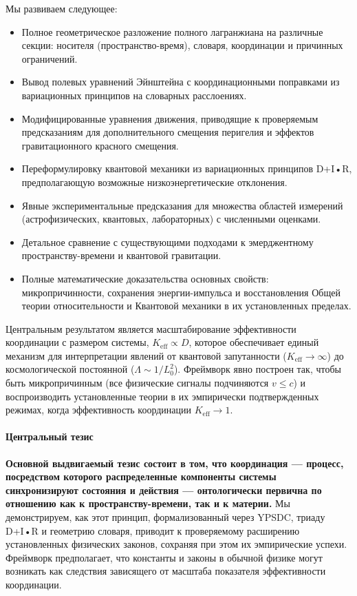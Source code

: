 \documentclass[11pt,a4paper]{article}
\begin{document}
	Мы развиваем следующее:
	\begin{itemize}
		\item Полное геометрическое разложение полного лагранжиана на различные секции: носителя (пространство-время), словаря, координации и причинных ограничений.
		\item Вывод полевых уравнений Эйнштейна с координационными поправками из вариационных принципов на словарных расслоениях.
		\item Модифицированные уравнения движения, приводящие к проверяемым предсказаниям для дополнительного смещения перигелия и эффектов гравитационного красного смещения.
		\item Переформулировку квантовой механики из вариационных принципов D+I•R, предполагающую возможные низкоэнергетические отклонения.
		\item Явные экспериментальные предсказания для множества областей измерений (астрофизических, квантовых, лабораторных) с численными оценками.
		\item Детальное сравнение с существующими подходами к эмерджентному пространству-времени и квантовой гравитации.
		\item Полные математические доказательства основных свойств: микропричинности, сохранения энергии-импульса и восстановления Общей теории относительности и Квантовой механики в их установленных пределах.
	\end{itemize}
	
	Центральным результатом является масштабирование эффективности координации с размером системы, \(K_{\mathrm{eff}} \propto D\), которое обеспечивает единый механизм для интерпретации явлений от квантовой запутанности (\(K_{\mathrm{eff}} \to \infty\)) до космологической постоянной (\(\Lambda \sim 1/L_0^2\)). Фреймворк явно построен так, чтобы быть микропричинным (все физические сигналы подчиняются \(v \leq c\)) и воспроизводить установленные теории в их эмпирически подтвержденных режимах, когда эффективность координации \(K_{\mathrm{eff}} \to 1\).
	
	\paragraph{Центральный тезис}
	\textbf{Основной выдвигаемый тезис состоит в том, что координация — процесс, посредством которого распределенные компоненты системы синхронизируют состояния и действия — онтологически первична по отношению как к пространству-времени, так и к материи.} Мы демонстрируем, как этот принцип, формализованный через YPSDC, триаду D+I•R и геометрию словаря, приводит к проверяемому расширению установленных физических законов, сохраняя при этом их эмпирические успехи. Фреймворк предполагает, что константы и законы в обычной физике могут возникать как следствия зависящего от масштаба показателя эффективности координации.
	
\end{document}
